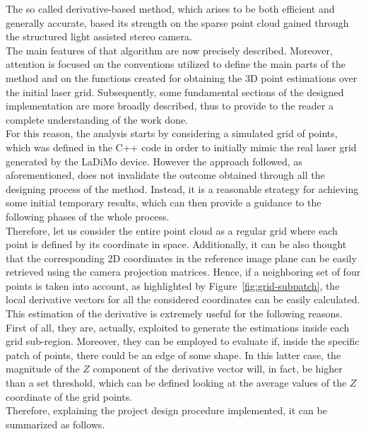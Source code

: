 The so called derivative-based method, which arises to be both efficient and generally accurate, based its strength on the sparse point cloud gained through the structured light assisted stereo camera.\\
The main features of that algorithm are now precisely described.
Moreover, attention is focused on the conventions utilized to define the main parts of the method and on the functions created for obtaining the 3D point estimations over the initial laser grid. 
Subsequently, some fundamental sections of the designed implementation are more broadly described, thus to provide to the reader a complete understanding of the work done. \\
For this reason, the analysis starts by considering a simulated grid of points, which was defined in the C++ code in order to initially mimic the real laser grid generated by the LaDiMo device. 
However the approach followed, as aforementioned, does not invalidate the outcome obtained through all the designing process of the method.
Instead, it is a reasonable strategy for achieving some initial temporary results, which can then provide a guidance to the following phases of the whole process.\\
Therefore, let us consider the entire point cloud as a regular grid where each point is defined by its coordinate in space.
Additionally, it can be also thought that the corresponding 2D coordinates in the reference image plane can be easily retrieved using the camera projection matrices.
Hence, if a neighboring set of four points is taken into account, as highlighted by Figure~\ref{fig:grid-subpatch}, the local derivative vectors for all the considered coordinates can be easily calculated.
This estimation of the derivative is extremely useful for the following reasons.
First of all, they are, actually, exploited to generate the estimations inside each grid sub-region.
Moreover, they can be employed to evaluate if, inside the specific patch of points, there could be an edge of some shape. 
In this latter case, the magnitude of the $Z$ component of the derivative vector will, in fact, be higher than a set threshold, which can be defined looking at the average values of the $Z$ coordinate of the grid points.\\
Therefore, explaining the project design procedure implemented, it can be summarized as follows.
